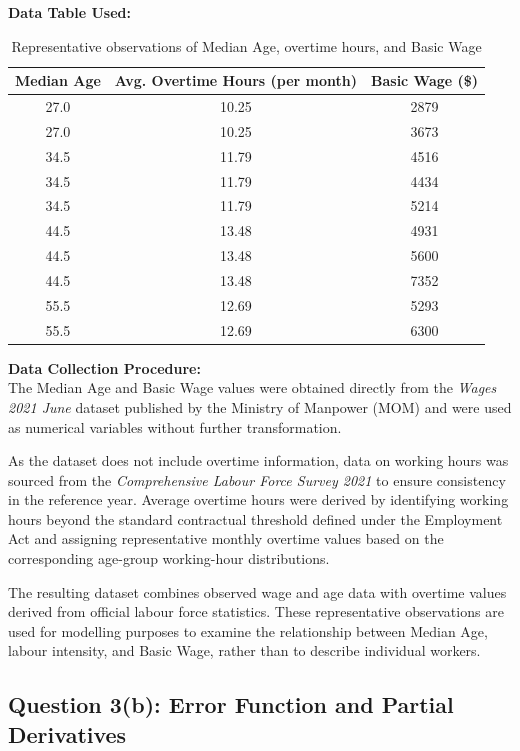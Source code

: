 \documentclass[12pt,a4paper,oneside]{report}
\begin{document}
\textbf{Data Table Used:}

\begin{table}[H]
\centering
\small
\caption{Representative observations of Median Age, overtime hours, and Basic Wage}
\label{tab:overtime_wage_data}
\begin{tabular}{|c|c|c|}
\hline
\textbf{Median Age} &
\textbf{Avg. Overtime Hours (per month)} &
\textbf{Basic Wage (\$)} \\
\hline
27.0 & 10.25 & 2879 \\
27.0 & 10.25 & 3673 \\
34.5 & 11.79 & 4516 \\
34.5 & 11.79 & 4434 \\
34.5 & 11.79 & 5214 \\
44.5 & 13.48 & 4931 \\
44.5 & 13.48 & 5600 \\
44.5 & 13.48 & 7352 \\
55.5 & 12.69 & 5293 \\
55.5 & 12.69 & 6300 \\
\hline
\end{tabular}
\end{table}


\textbf{Data Collection Procedure:} \\
The Median Age and Basic Wage values were obtained directly from the
\textit{Wages 2021 June} dataset published by the Ministry of Manpower (MOM)
and were used as numerical variables without further transformation.

As the dataset does not include overtime information, data on working hours
was sourced from the \textit{Comprehensive Labour Force Survey 2021} to ensure
consistency in the reference year. Average overtime hours were derived by
identifying working hours beyond the standard contractual threshold defined
under the Employment Act and assigning representative monthly overtime values
based on the corresponding age-group working-hour distributions.

The resulting dataset combines observed wage and age data with overtime
values derived from official labour force statistics. These representative
observations are used for modelling purposes to examine the relationship
between Median Age, labour intensity, and Basic Wage, rather than to describe
individual workers.

\subsection{Question 3(b): Error Function and Partial Derivatives}
\end{document}
